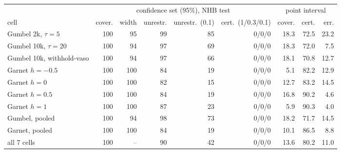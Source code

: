 \begin{tabular}{lrrrrrrrr}
\toprule
& \multicolumn{5}{c}{confidence set (95\%), NHB test} & \multicolumn{3}{c}{point interval} \\
\cmidrule(lr){2-6}\cmidrule(lr){7-9}
cell & cover. & width & unrestr. & unrestr.\ (0.1) & cert.\ (1/0.3/0.1) & cover. & cert. & err. \\
\midrule
Gumbel 2k, $\tau{=}5$ & 100 & 95 & 99 & 85 & 0/0/0 & 18.3 & 72.5 & 23.2 \\
Gumbel 10k, $\tau{=}20$ & 100 & 94 & 97 & 69 & 0/0/0 & 18.3 & 72.0 & 7.5 \\
Gumbel 10k, withhold-vaso & 100 & 94 & 97 & 66 & 0/0/0 & 18.1 & 70.8 & 12.7 \\
Garnet $h{=}{-}0.5$ & 100 & 100 & 84 & 19 & 0/0/0 & 5.1 & 82.2 & 12.9 \\
Garnet $h{=}0$ & 100 & 100 & 82 & 15 & 0/0/0 & 12.7 & 83.2 & 14.5 \\
Garnet $h{=}0.5$ & 100 & 100 & 84 & 19 & 0/0/0 & 16.8 & 90.2 & 4.6 \\
Garnet $h{=}1$ & 100 & 100 & 87 & 23 & 0/0/0 & 5.9 & 90.3 & 4.0 \\
\midrule
Gumbel, pooled & 100 & 94 & 98 & 73 & 0/0/0 & 18.2 & 71.7 & 14.5 \\
Garnet, pooled & 100 & 100 & 84 & 19 & 0/0/0 & 10.1 & 86.5 & 8.8 \\
all 7 cells & 100 & -- & 90 & 42 & 0/0/0 & 13.6 & 80.2 & 11.0 \\
\bottomrule
\end{tabular}
